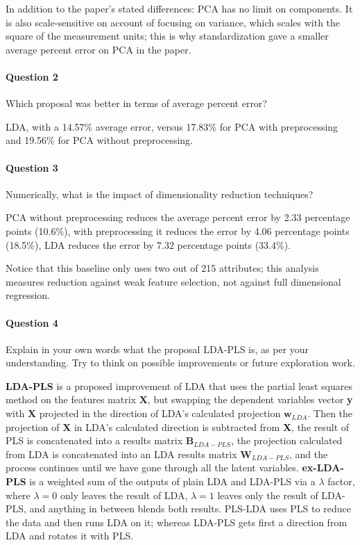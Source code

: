 \documentclass[journal]{IEEEtran}
\begin{document}
In addition to the paper's stated differences: PCA has no limit on components. It is also scale-sensitive on account of focusing on variance, which scales with the square of the measurement units; this is why standardization gave a smaller average percent error on PCA in the paper.
\\


\paragraph{Question 2} Which proposal was better in terms of average percent error?

LDA, with a 14.57\% average error, versus 17.83\% for PCA with preprocessing and 19.56\% for PCA without preprocessing.
\\


\paragraph{Question 3} Numerically, what is the impact of dimensionality reduction techniques?

PCA without preprocessing reduces the average percent error by 2.33 percentage points (10.6\%), with preprocessing it reduces the error by 4.06 percentage points (18.5\%), LDA reduces the error by 7.32 percentage points (33.4\%).

Notice that this baseline only uses two out of 215 attributes; this analysis measures reduction against weak feature selection, not against full dimensional regression.
\\


\paragraph{Question 4} Explain in your own words what the proposal LDA-PLS is, as per your understanding. Try to think on possible improvements or future exploration work.

\textbf{LDA-PLS} is a proposed improvement of LDA that uses the partial least squares method on the features matrix \textbf{X}, but swapping the dependent variables vector \textbf{y} with \textbf{X} projected in the direction of LDA's calculated projection $\mathbf{w}_{LDA}$. Then the projection of \textbf{X} in LDA's calculated direction is subtracted from \textbf{X}, the result of PLS is concatenated into a results matrix $\mathbf{B}_{LDA-PLS}$, the projection calculated from LDA is concatenated into an LDA results matrix $\mathbf{W}_{LDA-PLS}$, and the process continues until we have gone through all the latent variables. \textbf{ex-LDA-PLS} is a weighted sum of the outputs of plain LDA and LDA-PLS via a $\lambda$ factor, where $\lambda = 0$ only leaves the result of LDA, $\lambda = 1$ leaves only the result of LDA-PLS, and anything in between blends both results. PLS-LDA uses PLS to reduce the data and then runs LDA on it; whereas LDA-PLS gets first a direction from LDA and rotates it with PLS.
\end{document}
